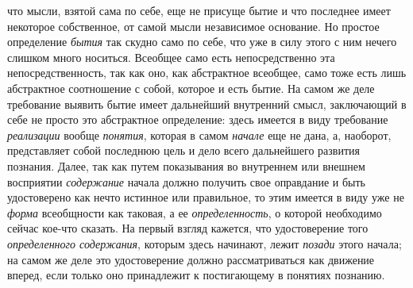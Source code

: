 \documentclass[twoside]{article}
\begin{document}
что мысли, взятой сама по себе, еще не присуще бытие и что последнее имеет
некоторое собственное, от самой мысли независимое основание. Но простое
определение {\em бытия}
так скудно само по себе, что уже в силу этого с ним нечего
слишком много носиться. Всеобщее само есть непосредственно эта
непосредственность, так как оно, как абстрактное всеобщее, само тоже есть
лишь абстрактное соотношение с собой, которое и есть бытие. На самом же
деле требование выявить бытие имеет дальнейший внутренний
смысл, заключающий в себе не просто это абстрактное определение: здесь
имеется в виду требование
{\em реализации} вообще
{\em понятия}, которая в
самом {\em начале} еще не
дана, а, наоборот, представляет собой последнюю цель и дело всего
дальнейшего развития познания. Далее, так как путем показывания во
внутреннем или внешнем восприятии
{\em содержание} начала
должно получить свое оправдание и быть удостоверено как нечто истинное или
правильное, то этим имеется в виду уже не
{\em форма} всеобщности
как таковая, а ее {\em определенность},
о которой необходимо сейчас кое-что сказать. На первый взгляд
кажется, что удостоверение того
{\em определенного содержания},
которым здесь начинают, лежит
{\em позади} этого
начала; на самом же деле это удостоверение должно рассматриваться как
движение вперед, если только оно принадлежит к постигающему в понятиях
познанию.
\end{document}
